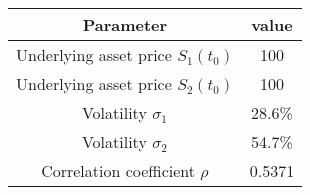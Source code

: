 \documentclass[11pt,reqno]{article}
\numberwithin{equation}{section}
\begin{document}
{%

\begin{table}[H]\small
\centering
\begin{tabular}{|c|c|}
\hline
\textbf{Parameter}                                                                                                                                                                & \textbf{value}                                                                               \\ \hline
Underlying asset price $S_1(t_0)$                                                                                                                                                 & 100                                                                                          \\ \hline
Underlying asset price $S_2(t_0)$                                                                                                                                                 & 100                                                                                          \\ \hline
Volatility $\sigma_1$                                                                                                                                                             & 28.6\%                                                                                       \\ \hline
Volatility $\sigma_2$                                                                                                                                                             & 54.7\%                                                                                       \\ \hline
Correlation coefficient $\rho$                                                                                                                                                    & 0.5371                                                                                       \\ \hline

\end{tabular}
\end{table}}
\end{document}
